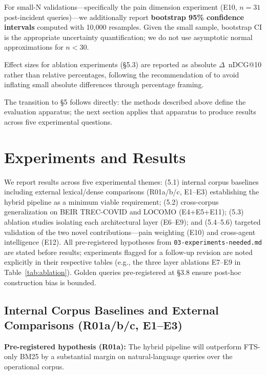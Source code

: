 For small-N validations---specifically the pain dimension experiment (E10, $n=31$
post-incident queries)---we additionally report \textbf{bootstrap 95\% confidence
intervals} computed with 10,000 resamples. Given the small sample, bootstrap CI is the
appropriate uncertainty quantification; we do not use asymptotic normal approximations for
$n < 30$.

Effect sizes for ablation experiments (\S5.3) are reported as absolute
$\Delta$~nDCG@10 rather than relative percentages, following the recommendation of
\cite{fuhr2018some} to avoid inflating small absolute differences through percentage
framing.

The transition to \S5 follows directly: the methods described above define the evaluation
apparatus; the next section applies that apparatus to produce results across five
experimental questions.

\section{Experiments and Results}

We report results across five experimental themes: (5.1) internal corpus baselines
including external lexical/dense comparisons (R01a/b/c, E1--E3) establishing the
hybrid pipeline as a minimum viable requirement; (5.2) cross-corpus generalization
on BEIR TREC-COVID and LOCOMO (E4+E5+E11); (5.3) ablation studies isolating each
architectural layer (E6--E9); and (5.4--5.6) targeted validation of the two novel
contributions---pain weighting (E10) and cross-agent intelligence (E12). All pre-registered
hypotheses from \texttt{03-experiments-needed.md} are stated before results; experiments
flagged for a follow-up revision are noted explicitly in their respective tables (e.g.,
the three layer ablations E7--E9 in Table~\ref{tab:ablation}). Golden queries
pre-registered at \S3.8 ensure post-hoc construction bias is bounded.

\subsection{Internal Corpus Baselines and External Comparisons (R01a/b/c, E1--E3)}

\textbf{Pre-registered hypothesis (R01a):} The hybrid pipeline will outperform FTS-only
BM25 by a substantial margin on natural-language queries over the operational corpus.

